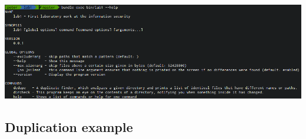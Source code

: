 \documentclass{article}
\begin{document}
  \begin{minipage}[b]{1.0\linewidth}
    \begin{center}
      \includegraphics[width=1.0\textwidth]{help}
    \end{center}
  \end{minipage}

  \newpage

  \subsection{Duplication example}
\end{document}

